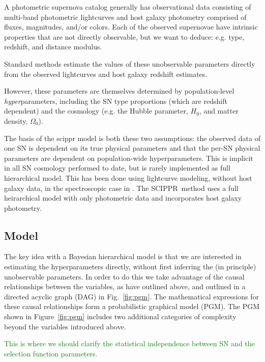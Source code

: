 \documentclass[12pt, twocolumn]{emulateapj}
\newcommand{\SCIPPR}{\textsc{SCIPPR}~}
\newcommand{\tkAM}[1]{\textcolor{green}{#1}}  %
\begin{document}

A photometric supernova catalog generally has observational data consisting of multi-band photometric lightcurves and host galaxy photometry comprised of fluxes, magnitudes, and/or colors. 
Each of the observed supernovae have intrinsic properties that are not directly observable, but we want to deduce: e.g. type, redshift, and distance modulus.  

Standard methods estimate the values of these unobservable parameters directly from the observed lightcurves and host galaxy redshift estimates.

However, these parameters are themselves determined by population-level \textit{hyper}parameters, including the SN type proportions (which are redshift dependent) and the cosmology (e.g. the Hubble parameter, $H_{0}$, and matter density, $\Omega_{0}$). 

The basis of the scippr model is both these two assumptions: the observed data of one SN is dependent on its true physical parameters and that the per-SN physical parameters are dependent on population-wide hyperparameters. 
This is implicit in all SN cosmology performed to date, but is rarely implemented as full hierarchical model. 
This has been done using lightcurve modeling, without host galaxy data, in the spectroscopic case in \cite{march/etal:2011}. 
The \SCIPPR method uses a full heirarchical model with only photometric data and incorporates host galaxy photometry.

\subsection{Model}
\label{sec:model}

The key idea with a Bayesian hierarchical model is that we are interested in estimating the hyperparameters directly, without first inferring the (in principle) unobservable parameters. 
In order to do this we take advantage of the causal relationships between the variables, as have outlined above, and outlined in a directed acyclic graph (DAG) in Fig.~\ref{fig:pgm}. 
The mathematical expressions for these causal relationships form a probabilistic graphical model (PGM).
The PGM shown in Figure~\ref{fig:pgm} includes two additional categories of complexity beyond the variables introduced above.

\tkAM{This is where we should clarify the statistical independence between SN and the selection function parameters.}  
\end{document}
